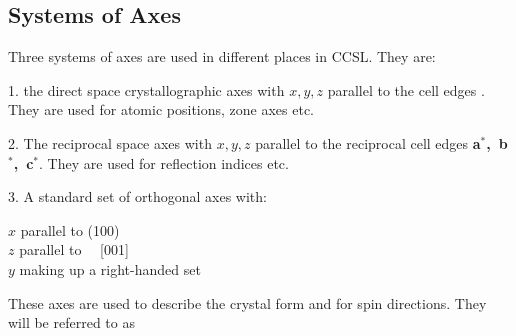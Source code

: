 \subsection{Systems of Axes}
Three systems of axes are used in different places in CCSL. They are:
\par 
\begin{list} {} {\setlength{\labelwidth}{1cm}
  \setlength{\parsep}{-1ex}
  \setlength{\leftmargin}{\labelwidth}
 \addtolength{\leftmargin}{1cm}}
\item[1. \hfill] the direct space
crystallographic axes with $x,y,z$ parallel to the cell edges 
.
They are used for atomic positions, zone axes etc.
\item[2. \hfill] The reciprocal space axes with $x,y,z$ parallel to the reciprocal
cell edges 
{\bfseries a$^*$,~b$^*$,~c$^*$}.  They are used for reflection indices etc.
\item[3. \hfill] A standard set of orthogonal axes with:\end{list}
\begin{varindent}{2cm}$x$ parallel to  (100)\\
$z$ parallel to \ \  [001]\\
$y$ making up a right-handed set\\
\end{varindent}
These axes are used to describe the crystal form and for
spin directions. They will be referred to as 
\p
\cardend\newpage
{}
%
